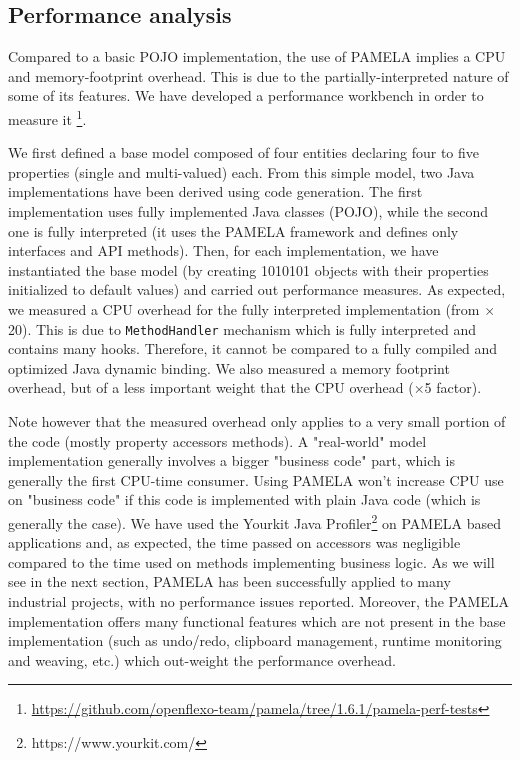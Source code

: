 
\subsection{Performance analysis}

Compared to a basic POJO implementation, the use of PAMELA implies a CPU and memory-footprint overhead. This is  due to the partially-interpreted nature of some of its features. We have developed a performance workbench in order to measure it \footnote {\url{https://github.com/openflexo-team/pamela/tree/1.6.1/pamela-perf-tests}}. 

We first defined a base model composed of four entities declaring four to five properties (single and multi-valued) each. From this simple model, two Java implementations have been derived using code generation. The first implementation uses fully implemented Java classes (POJO), while the second one is fully interpreted (it uses the PAMELA framework and defines only interfaces and API methods). Then, for each implementation, we have instantiated the base model (by creating 1010101 objects with their properties initialized to default values) and carried out performance measures.  As expected, we measured a CPU overhead for the fully interpreted implementation (from $\times$20). This is due to \texttt{MethodHandler} mechanism which is fully interpreted and contains many hooks. Therefore, it  cannot be compared to a fully compiled and optimized Java dynamic binding. We also measured a memory footprint overhead, but of a less important weight that the CPU overhead ($\times$5 factor).

Note however that the measured overhead only applies to a very small portion of the code (mostly property accessors methods).  A "real-world" model implementation generally involves a bigger "business code" part, which is generally the first CPU-time consumer. Using PAMELA won’t increase CPU use on "business code" if this code is implemented with plain Java code (which is generally the case). We have used the Yourkit Java Profiler\footnote{https://www.yourkit.com/} on PAMELA based applications and, as expected, the time passed on accessors was negligible compared to the time used on methods implementing business logic. As we will see in the next section, PAMELA has been successfully applied to many industrial projects, with no performance issues reported. Moreover, the PAMELA implementation offers many functional features which are not present in the base implementation (such as undo/redo, clipboard management, runtime monitoring and weaving, etc.) which out-weight the performance overhead.


